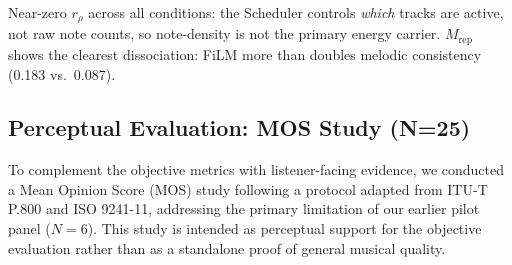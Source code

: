 \documentclass[pdflatex,sn-mathphys-num,twocolumn]{sn-jnl}
\theoremstyle{thmstyleone}
\theoremstyle{thmstyletwo}
\begin{document}
\begin{table}[!t]
\centering\small
\caption{Pipeline Decomposition Ablation. Each condition removes one component; all others remain active. 8 held-out 128-bar prompts.
  $r_\rho$: Pearson $r$, per-bar note count vs.\ E-level arc.
  $\Delta_\mathrm{trk}$: track activation error (Eq.~\ref{eq:delta_trk}).
  $C_\mathrm{KB}$: kick--bass onset co-occurrence~\%.
  $S_\emptyset$: degenerate section rate~\%.
  $M_\mathrm{rep}$: melodic 4-gram consistency (Eq.~\ref{eq:mrep}). Bold = best per column.}
\label{tab:decomp}
{\scriptsize Near-zero $r_\rho$ across all conditions: the Scheduler controls \emph{which} tracks are active, not raw note counts, so note-density is not the primary energy carrier. $M_\mathrm{rep}$ shows the clearest dissociation: FiLM more than doubles melodic consistency (0.183 vs.\ 0.087).}
\end{table}

\subsection{Perceptual Evaluation: MOS Study (N=25)}
\label{sec:mos}
To complement the objective metrics with listener-facing evidence, we conducted a Mean Opinion Score (MOS) study following a protocol adapted from ITU-T P.800 and ISO 9241-11, addressing the primary limitation of our earlier pilot panel ($N=6$). This study is intended as perceptual support for the objective evaluation rather than as a standalone proof of general musical quality.
\end{document}
